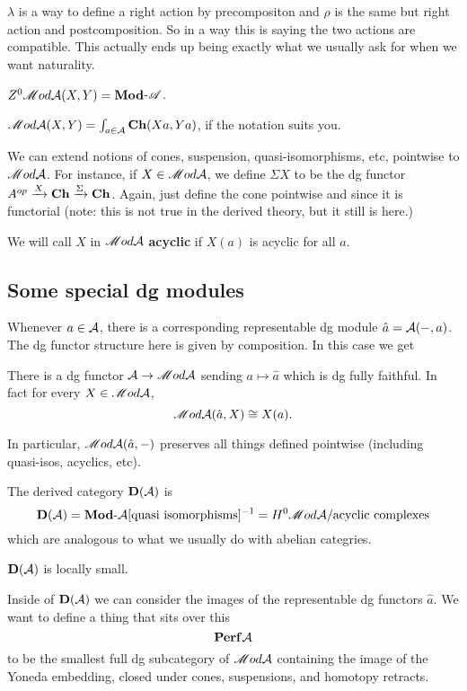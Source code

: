 \documentclass[12pt]{article}
\begin{document}
$\lambda$ is a way to define a right action by precompositon and $\rho$ is the same but right action and postcomposition. So in a way this is saying the two actions are compatible.
This actually ends up being exactly what we usually ask for when we want naturality.

\begin{rmk}
	$Z^0\mathscr{M} od\mathcal{A}(X,Y)=\mathbf{Mod}$-$\mathscr{A}$.
\end{rmk}
\begin{rmk}
	$\mathscr{M} od\mathcal{A}(X,Y)=\int_{a\in\mathcal{A}}\operatorname{\mathbf{Ch}}(Xa,Ya)$, if the notation suits you.
\end{rmk}

We can extend notions of cones, suspension, quasi-isomorphisms, etc, pointwise to $\mathscr{M} od \mathcal{A}$. For instance, if $X\in\mathscr{M} od\mathcal{A}$, we define $\Sigma X$ to be the dg functor 
$A^{op}\xrightarrow{X}\operatorname{\mathbf{Ch}}\xrightarrow{\Sigma}\operatorname{\mathbf{Ch}}$. Again, just define the cone pointwise and since it is functorial (note: this is not true in the 
derived theory, but it still is here.)

We will call $X$ in $\mathscr{M} od\mathcal{A}$ \textbf{acyclic} if $X(a)$ is acyclic for all $a$.

\subsection{Some special dg modules}
Whenever $a\in\mathcal{A}$, there is a corresponding representable dg module $\hat a=\mathcal{A}(-,a)$. The dg functor structure here is given by composition.
In this case we get 
\begin{lem}
	There is a dg functor $\mathcal{A}\to\mathscr{M} od\mathcal{A}$ sending $a\mapsto \hat a$ which is dg fully faithful. In fact for every $X\in\mathscr{M} od\mathcal{A}$,
	\[\mathscr{M} od\mathcal{A}(\hat a,X)\cong X(a).\]
\end{lem}

In particular, $\mathscr{M} od\mathcal{A}(\hat a,-)$ preserves all things defined pointwise (including quasi-isos, acyclics, etc).

\begin{defn}
	The derived category $\mathbf{D}(\mathcal{A})$ is 
	\[\mathbf{D}(\mathcal{A})=\mathbf{Mod}\text{-}\mathcal{A}[\text{quasi isomorphisms}]^{-1}=H^0\mathscr{M} od\mathcal{A}/{\text{acyclic complexes}}\]
	which are analogous to what we usually do with abelian categries.
\end{defn}
\begin{prop}
	$\mathbf{D}(\mathcal{A})$ is locally small.
\end{prop}

Inside of $\mathbf{D}(\mathcal{A})$ we can consider the images of the representable dg functors $\hat a$. We want to define a thing that sits over this 
\[\mathbf{Perf}\mathcal{A}\]
to be the smallest full dg subcategory of $\mathscr{M} od\mathcal{A}$ containing the image of the Yoneda embedding, closed under cones, suspensions, and homotopy retracts.
\end{document}
